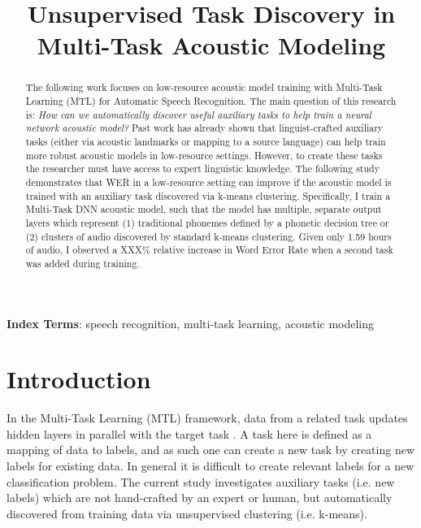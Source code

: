 \documentclass[a4paper]{article}
\title{Unsupervised Task Discovery in Multi-Task Acoustic Modeling}
\begin{document}
\maketitle
% 
\begin{abstract}

  The following work focuses on low-resource acoustic model training with Multi-Task Learning (MTL) for Automatic Speech Recognition. The main question of this research is: \textit{How can we automatically discover useful auxiliary tasks to help train a neural network acoustic model?} Past work has already shown that linguist-crafted auxiliary tasks (either via acoustic landmarks or mapping to a source language) can help train more robust acoustic models in low-resource settings. However, to create these tasks the researcher must have access to expert linguistic knowledge. The following study demonstrates that WER in a low-resource setting can improve if the acoustic model is trained with an auxiliary task discovered via k-means clustering. Specifically, I train a Multi-Task DNN acoustic model, such that the model has multiple, separate output layers which represent (1) traditional phonemes defined by a phonetic decision tree or (2) clusters of audio discovered by standard k-means clustering. Given only 1.59 hours of audio, I observed a XXX\% relative increase in Word Error Rate when a second task was added during training.

  
\end{abstract}

\noindent\textbf{Index Terms}: speech recognition, multi-task learning, acoustic modeling





\section{Introduction}

In the Multi-Task Learning (MTL) framework, data from a related task updates hidden layers in parallel with the target task \cite{caruana1997}. A task here is defined as a mapping of data to labels, and as such one can create a new task by creating new labels for existing data. In general it is difficult to create relevant labels for a new classification problem. The current study investigates auxiliary tasks (i.e. new labels) which are not hand-crafted by an expert or human, but automatically discovered from training data via unsupervised clustering (i.e. k-means).
\end{document}
